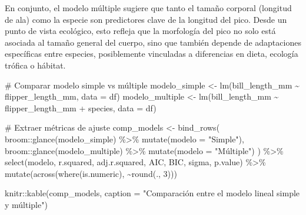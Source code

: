 \documentclass[
  spanish,
  11pt,
  a4paper,
  DIV=11,
  numbers=noendperiod]{scrartcl}
\newenvironment{Shaded}{\begin{snugshade}}{\end{snugshade}}
\newcommand{\AttributeTok}[1]{\textcolor[rgb]{0.40,0.45,0.13}{#1}}
\newcommand{\CommentTok}[1]{\textcolor[rgb]{0.37,0.37,0.37}{#1}}
\newcommand{\DecValTok}[1]{\textcolor[rgb]{0.68,0.00,0.00}{#1}}
\newcommand{\FunctionTok}[1]{\textcolor[rgb]{0.28,0.35,0.67}{#1}}
\newcommand{\NormalTok}[1]{\textcolor[rgb]{0.00,0.23,0.31}{#1}}
\newcommand{\OtherTok}[1]{\textcolor[rgb]{0.00,0.23,0.31}{#1}}
\newcommand{\SpecialCharTok}[1]{\textcolor[rgb]{0.37,0.37,0.37}{#1}}
\newcommand{\StringTok}[1]{\textcolor[rgb]{0.13,0.47,0.30}{#1}}
\begin{document}
En conjunto, el modelo múltiple sugiere que tanto el tamaño corporal
(longitud de ala) como la especie son predictores clave de la longitud
del pico. Desde un punto de vista ecológico, esto refleja que la
morfología del pico no solo está asociada al tamaño general del cuerpo,
sino que también depende de adaptaciones específicas entre especies,
posiblemente vinculadas a diferencias en dieta, ecología trófica o
hábitat.

\begin{Shaded}
\begin{Highlighting}[numbers=left,,]
\CommentTok{\# Comparar modelo simple vs múltiple}
\NormalTok{modelo\_simple }\OtherTok{\textless{}{-}} \FunctionTok{lm}\NormalTok{(bill\_length\_mm }\SpecialCharTok{\textasciitilde{}}\NormalTok{ flipper\_length\_mm, }\AttributeTok{data =}\NormalTok{ df)}
\NormalTok{modelo\_multiple }\OtherTok{\textless{}{-}} \FunctionTok{lm}\NormalTok{(bill\_length\_mm }\SpecialCharTok{\textasciitilde{}}\NormalTok{ flipper\_length\_mm }\SpecialCharTok{+}\NormalTok{ species, }\AttributeTok{data =}\NormalTok{ df)}

\CommentTok{\# Extraer métricas de ajuste}
\NormalTok{comp\_models }\OtherTok{\textless{}{-}} \FunctionTok{bind\_rows}\NormalTok{(}
\NormalTok{  broom}\SpecialCharTok{::}\FunctionTok{glance}\NormalTok{(modelo\_simple) }\SpecialCharTok{\%\textgreater{}\%} \FunctionTok{mutate}\NormalTok{(}\AttributeTok{modelo =} \StringTok{"Simple"}\NormalTok{),}
\NormalTok{  broom}\SpecialCharTok{::}\FunctionTok{glance}\NormalTok{(modelo\_multiple) }\SpecialCharTok{\%\textgreater{}\%} \FunctionTok{mutate}\NormalTok{(}\AttributeTok{modelo =} \StringTok{"Múltiple"}\NormalTok{)}
\NormalTok{) }\SpecialCharTok{\%\textgreater{}\%}
  \FunctionTok{select}\NormalTok{(modelo, r.squared, adj.r.squared, AIC, BIC, sigma, p.value) }\SpecialCharTok{\%\textgreater{}\%}
  \FunctionTok{mutate}\NormalTok{(}\FunctionTok{across}\NormalTok{(}\FunctionTok{where}\NormalTok{(is.numeric), }\SpecialCharTok{\textasciitilde{}}\FunctionTok{round}\NormalTok{(., }\DecValTok{3}\NormalTok{)))}

\NormalTok{knitr}\SpecialCharTok{::}\FunctionTok{kable}\NormalTok{(comp\_models,}
             \AttributeTok{caption =} \StringTok{"Comparación entre el modelo }
\StringTok{             lineal simple y múltiple"}\NormalTok{)}
\end{Highlighting}
\end{Shaded}
\end{document}
